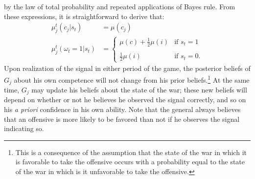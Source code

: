\documentclass[11pt,]{article}
\begin{document}
\noindent by the law of total probability and repeated applications of Bayes rule.  From these expressions, it is straightforward to derive that:
\begin{align}
\mu_j^t(c_j|s_t)&=\mu(c_j)\\
\mu_j^t(\omega_t=1|s_t)&=\left\{\begin{array}{ll}
\mu(c)+\frac{1}{2}\mu(i)&\mbox{if }s_t=1\\
&\\
\frac{1}{2}\mu(i)&\mbox{if }s_t=0.
\end{array}\right.
\end{align}Upon realization of the signal in either period of the game, the posterior beliefs of $G_j$ about his own competence will not change from his prior beliefs.\footnote{\normalsize\doublespacing This is a consequence of the assumption that the state of the war in which it is favorable to take the offensive occurs with a probability equal to the state of the war in which is it unfavorable to take the offensive.}  At the same time, $G_j$ may update his beliefs about the state of the war; these new beliefs will depend on whether or not he believes he observed the signal correctly, and so on his \textit{a priori} confidence in his own ability.  Note that the general always believes that an offensive is more likely to be favored than not if he observes the signal indicating so.
\end{document}
